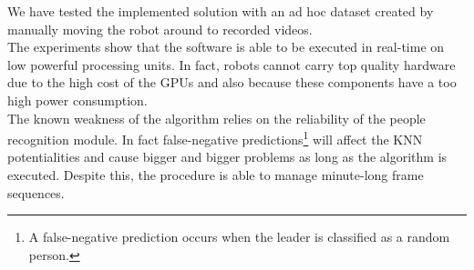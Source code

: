 We have tested the implemented solution with an ad hoc dataset created by manually moving the robot around to recorded videos.\\
The experiments show that the software is able to be executed in real-time on low powerful processing units. In fact, robots cannot carry top quality hardware due to the high cost of the GPUs and also because these components have a too high power consumption.\\
The known weakness of the algorithm relies on the reliability of the people recognition module. In fact false-negative predictions\footnote{A false-negative prediction occurs when the leader is classified as a random person.} will affect the KNN potentialities and cause bigger and bigger problems as long as the algorithm is executed. Despite this, the procedure is able to manage minute-long frame sequences.








